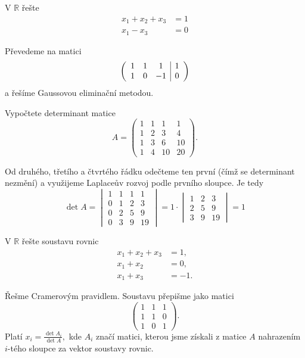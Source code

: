 \begin{priklad}
V $\mathbb R$ řešte
\begin{align*}
    x_1+x_2+x_3&=1\\
    x_1-x_3 &=0
\end{align*}
\end{priklad}

\begin{reseni}
Převedeme na matici
$$
\left (
\begin{array}{c c c | c }
1 & 1 & 1 & 1\\
1  & 0 &-1  &0
\end{array}
\right )
$$
a řešíme Gaussovou eliminační metodou.
\end{reseni}

\begin{priklad}
Vypočtete determinant matice
$$A=\begin{pmatrix}
    1  &1 &1 &1\\
    1 &2 &3 &4 \\
    1 &3 &6 &10\\
    1 &4 &10 &20
\end{pmatrix}.$$
\end{priklad}

\begin{reseni}
Od druhého, třetího a čtvrtého řádku odečteme ten první (čímž se determinant nezmění)
a využijeme Laplaceův rozvoj podle prvního sloupce. Je tedy
$$\det A = \begin{vmatrix}
    1 &1 &1 &1\\
    0 &1 &2 &3 \\
    0 &2 &5 &9 \\
    0 &3 &9 &19
\end{vmatrix}=1 \cdot \begin{vmatrix}
1 &2 &3 \\
2 &5 &9\\
3 &9 &19
\end{vmatrix}=1$$
\end{reseni}

\begin{priklad}
V $\mathbb R$ řešte  soustavu rovnic
\begin{align*}
    x_1+x_2+x_3 &=1,\\
    x_1+x_2 &= 0,\\
    x_1+x_3 &=-1.
\end{align*}
\end{priklad}

\begin{reseni}
Řešme Cramerovým pravidlem. Soustavu přepišme jako matici
$$
\begin{pmatrix}
    1 & 1&1\\
    1 &1 &0 \\
    1 &0 &1
\end{pmatrix}.
$$
Platí $x_i=\frac{\det A_i}{\det A},$ kde $A_i$ značí matici, kterou jsme získali
z matice $A$ nahrazením $i$-tého sloupce za vektor  soustavy rovnic.
\end{reseni}

